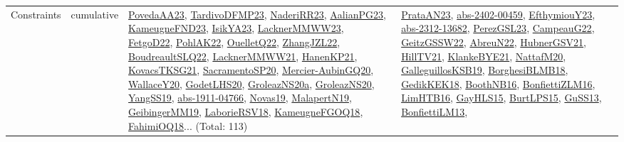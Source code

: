 {\begin{longtable}{lp{3cm}>{\raggedright}p{6cm}>{\raggedright}p{6cm}p{8cm}}
Constraints & cumulative & \href{papers/PovedaAA23.pdf}{PovedaAA23}\cite{PovedaAA23}, \href{papers/TardivoDFMP23.pdf}{TardivoDFMP23}\cite{TardivoDFMP23}, \href{articles/NaderiRR23.pdf}{NaderiRR23}\cite{NaderiRR23}, \href{papers/AalianPG23.pdf}{AalianPG23}\cite{AalianPG23}, \href{papers/KameugneFND23.pdf}{KameugneFND23}\cite{KameugneFND23}, \href{articles/IsikYA23.pdf}{IsikYA23}\cite{IsikYA23}, \href{articles/LacknerMMWW23.pdf}{LacknerMMWW23}\cite{LacknerMMWW23}, \href{articles/FetgoD22.pdf}{FetgoD22}\cite{FetgoD22}, \href{articles/PohlAK22.pdf}{PohlAK22}\cite{PohlAK22}, \href{papers/OuelletQ22.pdf}{OuelletQ22}\cite{OuelletQ22}, \href{papers/ZhangJZL22.pdf}{ZhangJZL22}\cite{ZhangJZL22}, \href{papers/BoudreaultSLQ22.pdf}{BoudreaultSLQ22}\cite{BoudreaultSLQ22}, \href{papers/LacknerMMWW21.pdf}{LacknerMMWW21}\cite{LacknerMMWW21}, \href{papers/HanenKP21.pdf}{HanenKP21}\cite{HanenKP21}, \href{papers/KovacsTKSG21.pdf}{KovacsTKSG21}\cite{KovacsTKSG21}, \href{articles/SacramentoSP20.pdf}{SacramentoSP20}\cite{SacramentoSP20}, \href{papers/Mercier-AubinGQ20.pdf}{Mercier-AubinGQ20}\cite{Mercier-AubinGQ20}, \href{articles/WallaceY20.pdf}{WallaceY20}\cite{WallaceY20}, \href{papers/GodetLHS20.pdf}{GodetLHS20}\cite{GodetLHS20}, \href{papers/GroleazNS20a.pdf}{GroleazNS20a}\cite{GroleazNS20a}, \href{papers/GroleazNS20.pdf}{GroleazNS20}\cite{GroleazNS20}, \href{papers/YangSS19.pdf}{YangSS19}\cite{YangSS19}, \href{articles/abs-1911-04766.pdf}{abs-1911-04766}\cite{abs-1911-04766}, \href{articles/Novas19.pdf}{Novas19}\cite{Novas19}, \href{papers/MalapertN19.pdf}{MalapertN19}\cite{MalapertN19}, \href{papers/GeibingerMM19.pdf}{GeibingerMM19}\cite{GeibingerMM19}, \href{articles/LaborieRSV18.pdf}{LaborieRSV18}\cite{LaborieRSV18}, \href{papers/KameugneFGOQ18.pdf}{KameugneFGOQ18}\cite{KameugneFGOQ18}, \href{articles/FahimiOQ18.pdf}{FahimiOQ18}\cite{FahimiOQ18}... (Total: 113) & \href{articles/PrataAN23.pdf}{PrataAN23}\cite{PrataAN23}, \href{articles/abs-2402-00459.pdf}{abs-2402-00459}\cite{abs-2402-00459}, \href{papers/EfthymiouY23.pdf}{EfthymiouY23}\cite{EfthymiouY23}, \href{articles/abs-2312-13682.pdf}{abs-2312-13682}\cite{abs-2312-13682}, \href{papers/PerezGSL23.pdf}{PerezGSL23}\cite{PerezGSL23}, \href{articles/CampeauG22.pdf}{CampeauG22}\cite{CampeauG22}, \href{papers/GeitzGSSW22.pdf}{GeitzGSSW22}\cite{GeitzGSSW22}, \href{articles/AbreuN22.pdf}{AbreuN22}\cite{AbreuN22}, \href{articles/HubnerGSV21.pdf}{HubnerGSV21}\cite{HubnerGSV21}, \href{papers/HillTV21.pdf}{HillTV21}\cite{HillTV21}, \href{papers/KlankeBYE21.pdf}{KlankeBYE21}\cite{KlankeBYE21}, \href{papers/NattafM20.pdf}{NattafM20}\cite{NattafM20}, \href{papers/GalleguillosKSB19.pdf}{GalleguillosKSB19}\cite{GalleguillosKSB19}, \href{articles/BorghesiBLMB18.pdf}{BorghesiBLMB18}\cite{BorghesiBLMB18}, \href{articles/GedikKEK18.pdf}{GedikKEK18}\cite{GedikKEK18}, \href{papers/BoothNB16.pdf}{BoothNB16}\cite{BoothNB16}, \href{papers/BonfiettiZLM16.pdf}{BonfiettiZLM16}\cite{BonfiettiZLM16}, \href{papers/LimHTB16.pdf}{LimHTB16}\cite{LimHTB16}, \href{papers/GayHLS15.pdf}{GayHLS15}\cite{GayHLS15}, \href{papers/BurtLPS15.pdf}{BurtLPS15}\cite{BurtLPS15}, \href{papers/GuSS13.pdf}{GuSS13}\cite{GuSS13}, \href{papers/BonfiettiLM13.pdf}{BonfiettiLM13}\cite{BonfiettiLM13}, 
\end{longtable}}
